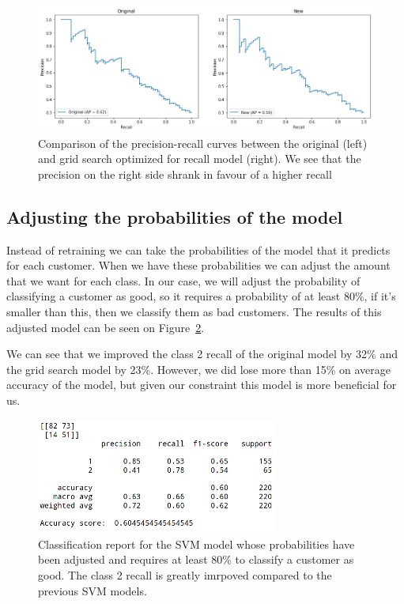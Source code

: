 \documentclass[runningheads]{llncs}
\begin{document}
\begin{figure}
\includegraphics[width=\textwidth]{images/svm_prec_recall_comp_plot.png}
\centering
\caption{Comparison of the precision-recall curves between the original (left) and grid search optimized for recall model (right). We see that the precision on the right side shrank in favour of a higher recall}
\label{svm_prec_recall_plot}
\end{figure}


\subsection{Adjusting the probabilities of the model}
Instead of retraining we can take the probabilities of the model that it predicts for each customer. When we have these probabilities we can adjust the amount that we want for each class. In our case, we will adjust the probability of classifying a customer as good, so it requires a probability of at least 80\%, if it's smaller than this, then we classify them as bad customers. The results of this adjusted model can be seen on Figure~\ref{svm_adjusted}. 

We can see that we improved the class 2 recall of the original model by 32\% and the grid search model by 23\%. However, we did lose more than 15\% on average accuracy of the model, but given our constraint this model is more beneficial for us.

\begin{figure}
\includegraphics[width=8cm]{images/svm_adjusted.png}
\centering
\caption{Classification report for the SVM model whose probabilities have been adjusted and requires at least 80\% to classify a customer as good. The class 2 recall is greatly imrpoved compared to the previous SVM models.}
\label{svm_adjusted}
\end{figure}
\end{document}
